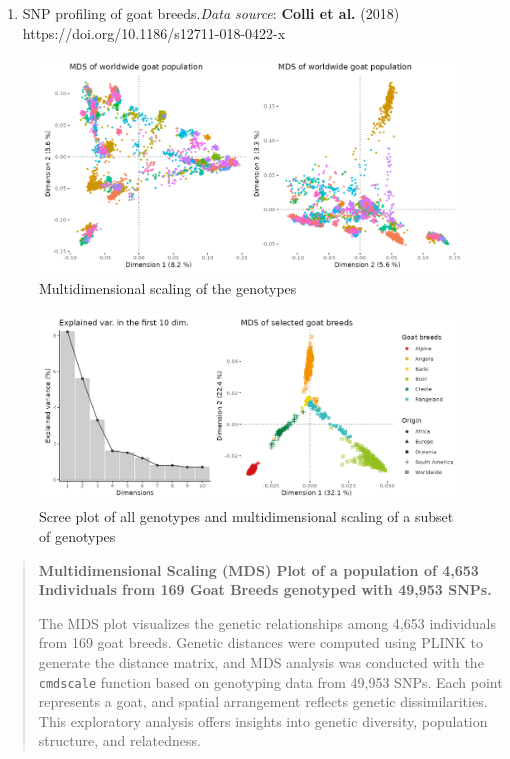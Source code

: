 \documentclass[a4paper,10pt]{article}
\begin{document}
\begin{enumerate}
  \def\labelenumi{\arabic{enumi}.}
  \tightlist
  \item
        SNP profiling of goat breeds.\emph{Data source}: \textbf{Colli et al.}
        (2018) https://doi.org/10.1186/s12711-018-0422-x
\end{enumerate}

\begin{figure}
  \centering
  \includegraphics[width=\linewidth]{Figures/goat_mds_12.png}
  \caption{Multidimensional scaling of the genotypes}
\end{figure}

\begin{figure}
  \centering
  \includegraphics[width=\linewidth]{Figures/goat_mds_eigen_filter.png}
  \caption{Scree plot of all genotypes and multidimensional scaling of a
    subset of genotypes}
\end{figure}

\begin{quote}
  \textbf{Multidimensional Scaling (MDS) Plot of a population of 4,653
    Individuals from 169 Goat Breeds genotyped with 49,953 SNPs.}

  The MDS plot visualizes the genetic relationships among 4,653 individuals
  from 169 goat breeds. Genetic distances were computed using PLINK to
  generate the distance matrix, and MDS analysis was conducted with the
  \texttt{cmdscale} function based on genotyping data from 49,953 SNPs.
  Each point represents a goat, and spatial arrangement reflects genetic
  dissimilarities. This exploratory analysis offers insights into genetic
  diversity, population structure, and relatedness.
\end{quote}
\end{document}
